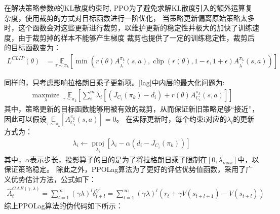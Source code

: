 在解决策略参数$\theta$的KL散度约束时, PPO为了避免求解KL散度引入的额外运算复杂度，使用裁剪的方式对目标函数进行一阶优化，
当策略更新偏离原始策略太多时，这个函数会对这些更新进行裁剪，以维护更新的稳定性并极大的加快了训练速度，由于裁剪掉的样本不能够产生梯度
裁剪也提供了一定的训练稳定性，裁剪后的目标函数变为：
\begin{align} 
    L^{C L I P}(\theta) & = \underset{\tau \sim \pi_{k}}{\mathbb{E}}\left[\min \left(r(\theta) {A}_{\lambda^{\prime}}^{\pi_{k}}(s, a), \operatorname{clip}\left(r(\theta), 1-\epsilon, 1+\epsilon\right) {A}_{\lambda^{\prime}}^{\pi_{k}}(s, a)\right)\right]
    \label{aloss}
\end{align}

同样的，只考虑影响拉格朗日乘子更新项。\autoref{lag}中内层的最大化问题为:
\begin{align}
    \underset{\lambda}{\operatorname{maxmize}} \ \underset{\tau \sim \pi_{k}}{\mathbb{E}}\left[\sum_{i}^{m} \lambda_{i}\left[(J_{C_{i}}(\pi_{k})-d_{i})+r(\theta)A_{C_{i}}^{\pi_{k}}(s, a)\right]\right]
\end{align}    
其中，策略更新的目标函数能够用被有效的裁剪，从而保证新旧策略足够“接近”，
因此可以假设$ \underset{\tau \sim \pi_{k}}{\mathbb{E}}\left[A_{C_{i}}^{\pi_{k}}(s, a)\right]= 0$\cite{zhang2020first}。
在实际更新时，每个约束i对应的$\lambda_{i}$的更新方式为：
\begin{align}
    \lambda_{i} \leftarrow \underset{\lambda_{i}}{\operatorname{proj}}\left[\lambda_{i}-\alpha\left(d_{i}-J_{C_{i}}(\pi_{k})\right)\right]
\end{align}
其中，$\alpha$表示步长，投影算子的目的是为了将拉格朗日乘子限制在$\left [ 0,\lambda_{max} \right ] $中，以保证策略稳定。
除此之外，PPOLag算法为了更好的评估优势值函数，采用了广义优势估计方法，公式如下：
\begin{align}
    \widehat{A}_{t}^{G A E(\gamma, \lambda)} = \sum_{l = 1}^{\infty}(\gamma \lambda)^{l} \delta_{t+l}^{V} = \sum_{l= 1}^{\infty}(\gamma \lambda)^{l}\left(r_{t}+\gamma V\left(s_{t+l+1}\right)-V\left(s_{t+l}\right)\right)
\end{align}
综上PPOLag算法的伪代码如下所示：
